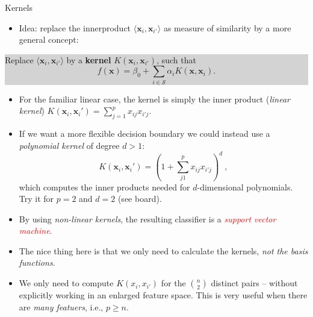 \documentclass[10pt,ignorenonframetext,]{beamer}
\providecommand{\tightlist}{%
  \setlength{\itemsep}{0pt}\setlength{\parskip}{0pt}}
\begin{document}
\begin{frame}

\begin{block}{Kernels}

\begin{itemize}
\tightlist
\item
  Idea: replace the innerproduct
  \(\langle {\boldsymbol x}_i, {\boldsymbol x}_{i'}\rangle\) as measure
  of similarity by a more general concept:
\end{itemize}

\begin{center}
\colorbox{lightgray}{\begin{minipage}{10cm}
Replace $\langle {\boldsymbol x}_i, {\boldsymbol x}_{i'}\rangle$ by a {\bf kernel} 
$K({\boldsymbol x}_i,{\boldsymbol x}_{i'})$, such that
$$
f({\boldsymbol x})=\beta_0 + \sum_{i \in \mathcal{S}} \alpha_i K({\boldsymbol x},{\boldsymbol x}_i).
$$
\end{minipage}}
\end{center}

\begin{itemize}
\tightlist
\item
  For the familiar linear case, the kernel is simply the inner product
  (\emph{linear kernel})
  \(K({\boldsymbol x}_i,{\boldsymbol x}_i')=\sum_{j=1}^p x_{ij}x_{i'j}\).
\end{itemize}

\begin{itemize}
\tightlist
\item
  If we want a more flexible decision boundary we could instead use a
  \emph{polynomial kernel} of degree \(d>1\): \[
  K({\boldsymbol x}_i,{\boldsymbol x}_i')=(1+\sum_{j1}^p x_{ij} x_{i'j})^d \ , 
  \] which computes the inner products needed for \(d\)-dimensional
  polynomials. Try it for \(p=2\) and \(d=2\) (see board).
\end{itemize}

\end{block}

\end{frame}

\begin{frame}

\begin{itemize}
\item
  By using \emph{non-linear kernels}, the resulting classifier is a
  \emph{\textcolor{red}{support vector machine}}.
\item
  The nice thing here is that we only need to calculate the kernels,
  \emph{not the basis functions}.
\item
  We only need to compute \(K(x_i,x_{i'})\) for the \({n \choose 2}\)
  distinct pairs -- without explicitly working in an enlarged feature
  space. This is very useful when there are \emph{many featuers}, i.e.,
  \(p\geq n\).
\end{itemize}

\end{frame}
\end{document}
